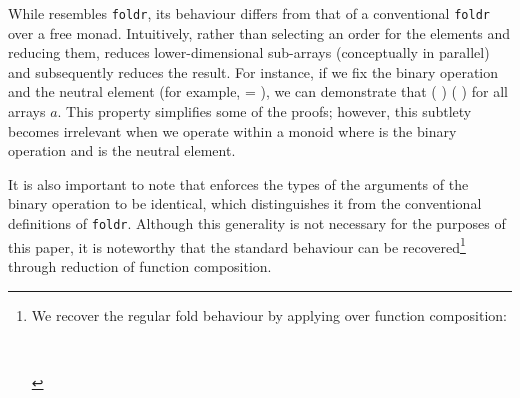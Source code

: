 While  resembles \texttt{foldr}, its behaviour differs from that of a
conventional \texttt{foldr} over a free monad. Intuitively, rather than
selecting an order for the elements and reducing them,  reduces
lower-dimensional sub-arrays (conceptually in parallel) and subsequently
reduces the result. For instance, if we fix the binary operation  and the
neutral element  (for example,  =   ), we can
demonstrate that  (  )   (
) for all arrays \(a\). This property simplifies some of the proofs;
however, this subtlety becomes irrelevant when we operate within a monoid where
 is the binary operation and  is the neutral element.

It is also important to note that  enforces the types of the arguments
of the binary operation to be identical, which distinguishes it from the
conventional definitions of \texttt{foldr}. Although this generality is not
necessary for the purposes of this paper, it is noteworthy that the standard
behaviour can be recovered\footnote{We recover the regular fold behaviour by
applying  over function composition:
\begin{code}%
%
\>[2]\AgdaSpace{}%
\AgdaSymbol{:}\AgdaSpace{}%
\AgdaSymbol{(}\AgdaSpace{}%
\AgdaSpace{}%
\AgdaSpace{}%
\AgdaSpace{}%
\AgdaSymbol{)}\AgdaSpace{}%
\AgdaSpace{}%
\AgdaSpace{}%
\AgdaSpace{}%
\AgdaSpace{}%
\AgdaSpace{}%
\AgdaSpace{}%
\AgdaSpace{}%
\<%
\\
%
\>[2]\AgdaSpace{}%
\AgdaSpace{}%
\AgdaSpace{}%
\AgdaSpace{}%
\AgdaSymbol{=}\AgdaSpace{}%
\AgdaSpace{}%
\AgdaSpace{}%
\AgdaSpace{}%
\AgdaSymbol{(}\AgdaSpace{}%
\AgdaSpace{}%
\AgdaSymbol{)}\AgdaSpace{}%
\<%
\end{code}
} through reduction of function composition.

